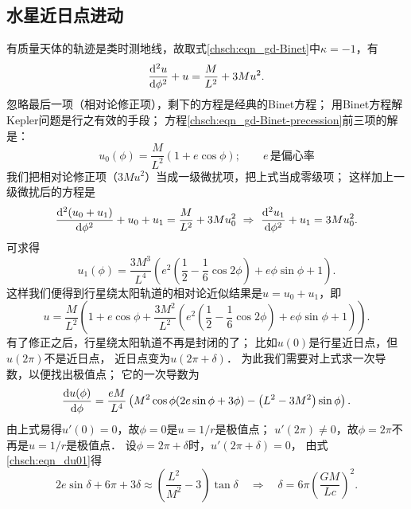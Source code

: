 \subsection{水星近日点进动}
有质量天体的轨迹是类时测地线，故取式\eqref{chsch:eqn_gd-Binet}中$\kappa=-1$，有
\begin{equation}\label{chsch:eqn_gd-Binet-precession}
    \frac{{\rm d}^2 u}{{\rm d} \phi^2}+u =  \frac{M}{L^2} + 3Mu^2.
\end{equation}
忽略最后一项（相对论修正项），剩下的方程是经典的Binet方程；
用Binet方程\cite[p.321]{zhuzx-zy-vI}解Kepler问题是行之有效的手段；
方程\eqref{chsch:eqn_gd-Binet-precession}前三项的解是：
\begin{equation}\label{chsch:eqn_kepler}
    u_0(\phi)=\frac{M}{L^2} \left( 1+ e\cos\phi\right);\qquad
    e \, \text{是偏心率}
\end{equation}
我们把相对论修正项（$3Mu^2$）当成一级微扰项，把上式当成零级项；
这样加上一级微扰后的方程是
\begin{equation}
    \frac{{\rm d}^2 (u_0+u_1)}{{\rm d} \phi^2}+u_0+u_1 =  \frac{M}{L^2} + 3Mu_0^2
    \ \Rightarrow \ 
    \frac{{\rm d}^2 u_1}{{\rm d} \phi^2}+u_1 =  3Mu_0^2 .
\end{equation}
可求得
\begin{equation}\label{chsch:eqn_u1}
    u_1(\phi)= \frac{3 M^3 }{L^4} \left(e^2 \left(\frac{1}{2}-\frac{1}{6} \cos 2 \phi \right)
    +e \phi  \sin \phi +1\right) .
\end{equation}
这样我们便得到行星绕太阳轨道的相对论近似结果是$u=u_0+u_1$，即
\begin{equation}
    u=\frac{M}{L^2} \left( 1+ e\cos\phi
    +\frac{3 M^2 }{L^2} \left(e^2 \left(\frac{1}{2}-\frac{1}{6} \cos 2 \phi \right)
    +e \phi  \sin \phi +1\right)\right) .
\end{equation}
有了修正之后，行星绕太阳轨道不再是封闭的了；
比如$u(0)$是行星近日点，但$u(2\pi)$不是近日点，
近日点变为$u(2\pi +\delta)$．
为此我们需要对上式求一次导数，以便找出极值点；
它的一次导数为
\begin{equation}\label{chsch:eqn_du01}
    \frac{{\rm d}u(\phi)}{{\rm d}\phi}=\frac{e M}{L^4} 
    \left(M^2 \cos\phi (2 e \sin\phi+3 \phi )-\left(L^2-3 M^2\right) \sin \phi\right).
\end{equation}
由上式易得$u'(0)=0$，故$\phi=0$是$u=1/r$是极值点；
$u'(2\pi)\neq 0$，故$\phi=2\pi$不再是$u=1/r$是极值点．
设$\phi=2\pi+\delta$时，$u'(2\pi+\delta)= 0$，
由式\eqref{chsch:eqn_du01}得
\begin{equation}
     2 e \sin\delta+ 6\pi +3 \delta \approx \left(\frac{L^2}{M^2}-3\right) \tan\delta 
     \quad \Rightarrow \quad    \delta = 6\pi \left(\frac{GM }{Lc}\right)^2 .
\end{equation}
